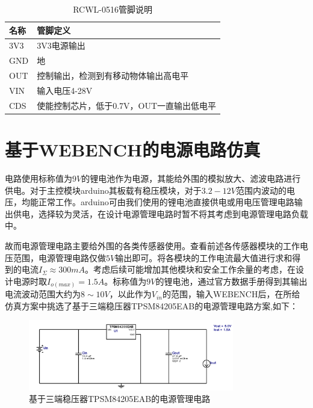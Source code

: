 \documentclass[a4paper, 11pt]{article} %
\begin{document}
\begin{table}[H]
  \centering
  \label{tab6}
  \begin{threeparttable}
    \small
    \begin{tabular} {p{80pt}p{220pt}}
      \hline
      名称&管脚定义\\
      \hline
      3V3&3V3电源输出\\
      GND&地\\
      OUT&控制输出，检测到有移动物体输出高电平\\
      VIN&输入电压4-28V\\
      CDS&使能控制芯片，低于0.7V，OUT一直输出低电平\\
      \hline
    \end{tabular}
    \small
  \end{threeparttable}
  \caption{RCWL-0516管脚说明}
\end{table}

\section{基于WEBENCH的电源电路仿真}

电路使用标称值为$9V$的锂电池作为电源，其能给外围的模拟放大、滤波电路进行供电。对于主控模块arduino其板载有稳压模块，对于$3.2-12V$范围内波动的电压，均能正常工作。arduino可由我们使用的锂电池直接供电或用电压管理电路输出供电，选择较为灵活，在设计电源管理电路时暂不将其考虑到电源管理电路负载中。

故而电源管理电路主要给外围的各类传感器使用。查看前述各传感器模块的工作电压范围，电源管理电路仅做$5V$输出即可。将各模块的工作电流最大值进行求和得到的电流$I_\Sigma \approx 300mA$。考虑后续可能增加其他模块和安全工作余量的考虑，在设计电源时取$I_{o(max)} = 1.5A$。标称值为$9V$的锂电池，通过官方数据手册得到其输出电流波动范围大约为$8 \sim 10V$，以此作为$V_{in}$的范围，输入WEBENCH后，在所给仿真方案中挑选了基于三端稳压器TPSM84205EAB的电源管理电路方案,如下：

\begin{figure}[H]
  \centering
  \includegraphics[width = 0.8\textwidth]{TPS_circuit.jpg}
  \caption{基于三端稳压器TPSM84205EAB的电源管理电路}
\end{figure}
\end{document}
